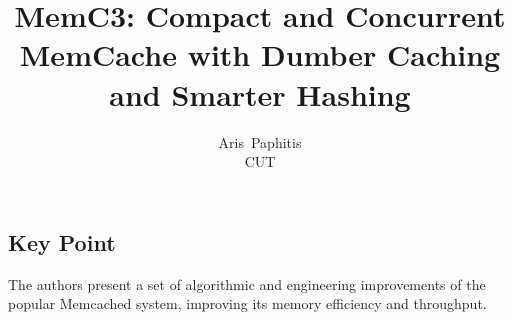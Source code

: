 \documentclass[letterpaper,twocolumn,10pt]{article}
\begin{document}
\date{}

\title{\Large \bf MemC3: Compact and Concurrent MemCache with Dumber Caching and Smarter Hashing}

\author{
{\rm Aris\ Paphitis}\\
CUT
} %

\maketitle

\thispagestyle{empty}


\subsection*{Key Point}
The authors present a set of algorithmic and engineering improvements of the popular Memcached system, improving its memory efficiency and throughput.
\end{document}
